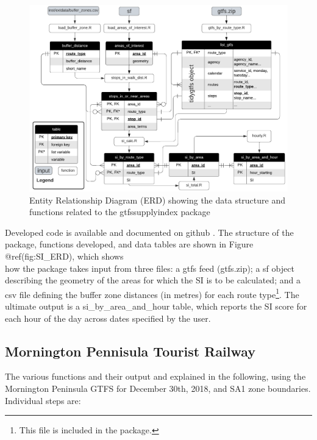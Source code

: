\documentclass[preprint, 3p,
authoryear]{elsarticle} %
\begin{document}
\begin{figure}
\includegraphics[width=1\linewidth]{graphics/SI_data_structure} \caption{Entity Relationship Diagram (ERD) showing the data structure and functions related to the gtfssupplyindex package}\label{fig:SI_ERD}
\end{figure}

Developed code is available and documented on github
\citep{gtfssupplyindex_github}. The structure of the package, functions
developed, and data tables are shown in Figure @ref(fig:SI\_ERD), which
shows\\
how the package takes input from three files: a gtfs feed (gtfs.zip); a
sf object describing the geometry of the areas for which the SI is to be
calculated; and a csv file defining the buffer zone distances (in
metres) for each route type\footnote{This file is included in the
  package.}. The ultimate output is a si\_by\_area\_and\_hour table,
which reports the SI score for each hour of the day across dates
specified by the user.

\hypertarget{mornington-pennisula-tourist-railway}{%
\subsection{Mornington Pennisula Tourist
Railway}\label{mornington-pennisula-tourist-railway}}

The various functions and their output and explained in the following,
using the Mornington Peninsula GTFS for December 30th, 2018, and SA1
zone boundaries. Individual steps are:
\end{document}
